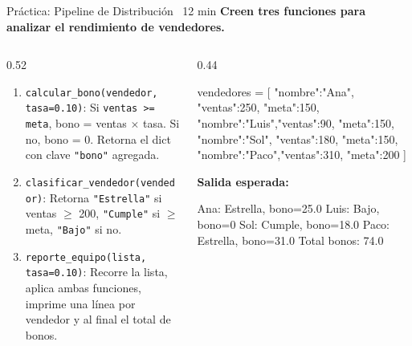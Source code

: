 \documentclass[aspectratio=169, 11pt]{beamer}
\begin{document}
\begin{frame}[fragile,shrink=30]{Práctica: Pipeline de Distribución \hfill
    {\normalsize\color{arcaRed}\faClock\ 12 min}}
  \vspace{-6pt}
  {\footnotesize\color{arcaDark}\bfseries
    Creen tres funciones para analizar el rendimiento de vendedores.}

  \vspace{2pt}
  \begin{columns}[T]
    \begin{column}{0.52\textwidth}
      {\footnotesize
      \begin{enumerate}\setlength{\itemsep}{3pt}
        \item \texttt{calcular\_bono(vendedor, tasa=0.10)}:
              Si \texttt{ventas >= meta}, bono = ventas $\times$ tasa.
              Si no, bono = 0.
              Retorna el dict con clave \texttt{"bono"} agregada.
        \item \texttt{clasificar\_vendedor(vendedor)}:
              Retorna \texttt{"Estrella"} si ventas $\geq$ 200,
              \texttt{"Cumple"} si $\geq$ meta,
              \texttt{"Bajo"} si no.
        \item \texttt{reporte\_equipo(lista, tasa=0.10)}:
              Recorre la lista, aplica ambas funciones,
              imprime una línea por vendedor y al final
              el total de bonos.
      \end{enumerate}
      }
    \end{column}

    \begin{column}{0.44\textwidth}
      \begin{pyblock}
vendedores = [
  {"nombre":"Ana", "ventas":250,
   "meta":150},
  {"nombre":"Luis","ventas":90,
   "meta":150},
  {"nombre":"Sol", "ventas":180,
   "meta":150},
  {"nombre":"Paco","ventas":310,
   "meta":200}
]
      \end{pyblock}

      \vspace{2pt}
      {\scriptsize\color{textMuted}\bfseries Salida esperada:}
      \begin{outputblock}
Ana: Estrella, bono=25.0
Luis: Bajo, bono=0
Sol: Cumple, bono=18.0
Paco: Estrella, bono=31.0
Total bonos: 74.0
      \end{outputblock}
    \end{column}
  \end{columns}
\end{frame}
\end{document}
